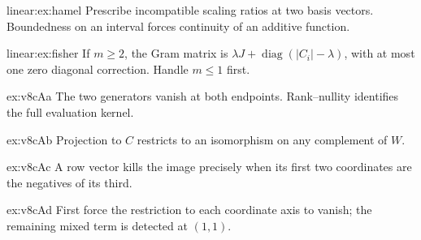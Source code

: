 \begin{hint}{linear:ex:hamel}
Prescribe incompatible scaling ratios at two basis vectors. Boundedness on an interval forces continuity of an additive function.
\end{hint}
\begin{hint}{linear:ex:fisher}
If $m\ge2$, the Gram matrix is $\lambda J+\operatorname{diag}(|C_i|-\lambda)$, with at most one zero diagonal correction. Handle $m\le1$ first.
\end{hint}
\begin{hint}{ex:v8cAa}
The two generators vanish at both endpoints. Rank--nullity identifies the full evaluation kernel.
\end{hint}
\begin{hint}{ex:v8cAb}
Projection to $C$ restricts to an isomorphism on any complement of $W$.
\end{hint}
\begin{hint}{ex:v8cAc}
A row vector kills the image precisely when its first two coordinates are the negatives of its third.
\end{hint}
\begin{hint}{ex:v8cAd}
First force the restriction to each coordinate axis to vanish; the remaining mixed term is detected at $(1,1)$.
\end{hint}

